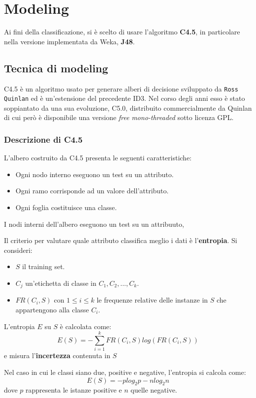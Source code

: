 \chapter{Modeling}
Ai fini della classificazione, si è scelto di usare l'algoritmo \textbf{C4.5}, in particolare nella versione implementata da Weka, \textbf{J48}.

\section{Tecnica di modeling}
C4.5 è un algoritmo usato per generare alberi di decisione sviluppato da \texttt{Ross Quinlan} ed è un'estensione del precedente ID3. Nel corso degli anni esso è stato soppiantato da una sua evoluzione, C5.0, distribuito commercialmente da Quinlan di cui però è disponibile una versione \textit{free} \textit{mono-threaded} sotto licenza GPL\cite{C50}.


\subsection{Descrizione di C4.5}
L'albero costruito da C4.5 presenta le seguenti caratteristiche:
\begin{itemize}
	\item Ogni nodo interno eseguono un test su un attributo.
	\item Ogni ramo corrisponde ad un valore dell'attributo.
	\item Ogni foglia costituisce una classe.
\end{itemize}

I nodi interni dell'albero eseguono un test su un attribuuto, 

Il criterio per valutare quale attributo classifica meglio i dati è l'\textbf{entropia}. Si consideri:
\begin{itemize}
	\item $S$ il training set.
	\item $C_j$ un'etichetta di classe in $C_1, C_2, ..., C_k$.
	\item $FR(C_i, S)$ con $1 \leq i \leq k$ le frequenze relative delle instanze in $S$ che appartengono alla classe $C_i$.
\end{itemize}
L'entropia $E$ su $S$ è calcolata come:
$$ E(S) = - \sum_{i=1}^{k} FR(C_i, S)log(FR(C_i, S)) $$
e misura l'\textbf{incertezza} contenuta in $S$

Nel caso in cui le classi siano due, positive e negative, l'entropia si calcola come:
$$ E(S) = -plog_2p - nlog_2n $$
dove $p$ rappresenta le istanze positive e $n$ quelle negative.

